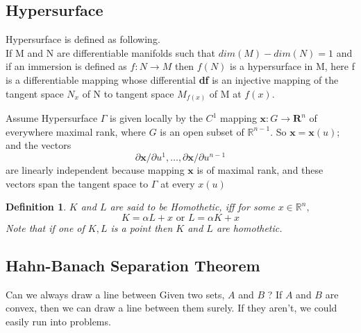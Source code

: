 \documentclass[oneside]{book}
\newtheorem{mydef}{Definition}[section]
\begin{document}
	
	
	
	
	
	
	
	
	
	
	
	
	
	
	
	
	
	
	
	
	
	
	
	
	
	
	
	
	
	
	
	
	
	
		\subsection{Hypersurface}
	
	\label{ss:10}
	
	
	Hypersurface is defined as following.
	\\If M and N are differentiable manifolds such that $dim(M)-dim(N) = 1 $ and if an immersion is defined as $f: N\rightarrow M$ then $f(N)$ is a hypersurface in M, here f is a differentiable mapping whose differential \textbf{df} is an injective mapping of the 
	tangent space $N_{x}$ of N to  tangent space $M_{f(x)}$ of M at $f(x)$.
	
	
	
	
	Assume  Hypersurface $\Gamma$ is given locally by the $C^{1}$ mapping $\mathbf{x}: G \rightarrow \mathbf{R}^{n}$ of everywhere
	maximal rank, where $G$ is an open subset of $\mathbb{R}^{n-1} .$ So $\mathbf{x}=\mathbf{x}(u)$; and the vectors \\
	$$
	\partial \mathbf{x} / \partial u^{1}, \ldots, \partial \mathbf{x} / \partial u^{n-1} 
	$$
	are linearly independent because  mapping $\mathbf{x}$ is of maximal rank, and these vectors span the tangent space to $\Gamma$ at every $x(u)$\\
	\begin{mydef} \label{d:2}
		$K$ and $L$ are said to be Homothetic, iff for some $x  \in \mathbb{R}^n,$ \\
		$$K = \alpha L + x \text{ or } L=\alpha K+x $$
		Note that if one of $K, L $ is a point then $K $ and $L$ are homothetic.
	\end{mydef}
	
	
	
	\subsection{Hahn-Banach Separation Theorem}
	\label{ss:11}
	Can we always draw a line between Given two sets, $ A$ and $ B$ ?
	If $ A$ and $ B$ are convex, then we can draw a line between them surely. If they aren't, we could easily run into problems.
	
\end{document}
